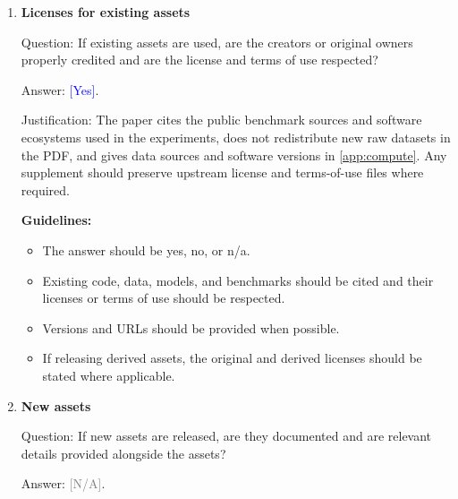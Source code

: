 \documentclass{article}
\theoremstyle{plain}
\theoremstyle{definition}
\newcommand{\1}{\mathbf{1}}
\providecommand{\answerYes}[1][]{\textcolor{blue}{[Yes]#1}}
\providecommand{\answerNA}[1][]{\textcolor{gray}{[N/A]#1}}
\begin{document}
\begin{enumerate}[leftmargin=5mm]
Answer: \answerNA{}.

Justification: The paper does not introduce a system that generates content or
interacts with users, and it does not release new high-risk artifacts requiring
special safeguards.

\textbf{Guidelines:}
\begin{itemize}[leftmargin=5mm, noitemsep]
\item The answer should be yes, no, or n/a.
\item High-risk or dual-use model releases should include appropriate access,
usage, or release safeguards.
\item Dataset releases that may contain unsafe content should describe how
unsafe material was avoided or controlled.
\end{itemize}

\item \textbf{Licenses for existing assets}

Question: If existing assets are used, are the creators or original owners
properly credited and are the license and terms of use respected?

Answer: \answerYes{}.

Justification: The paper cites the public benchmark sources and software
ecosystems used in the experiments, does not redistribute new raw datasets in
the PDF, and gives data sources and software versions in
\cref{app:compute}. Any supplement should preserve upstream license
and terms-of-use files where required.

\textbf{Guidelines:}
\begin{itemize}[leftmargin=5mm, noitemsep]
\item The answer should be yes, no, or n/a.
\item Existing code, data, models, and benchmarks should be cited and their
licenses or terms of use should be respected.
\item Versions and URLs should be provided when possible.
\item If releasing derived assets, the original and derived licenses should be
stated where applicable.
\end{itemize}

\item \textbf{New assets}

Question: If new assets are released, are they documented and are relevant
details provided alongside the assets?

Answer: \answerNA{}.


\end{enumerate}
\end{document}

